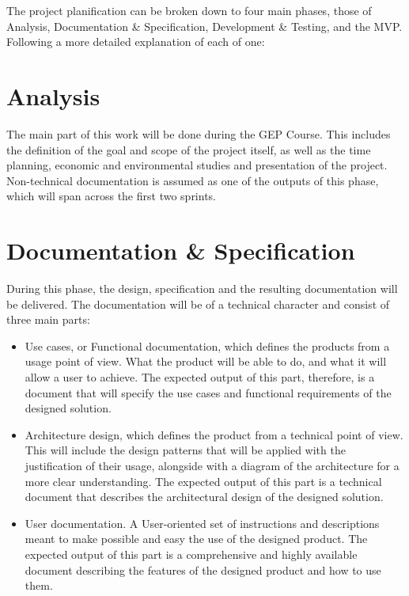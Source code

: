 The project planification can be broken down to four main phases, those of Analysis, Documentation \& Specification, Development \& Testing, and the MVP. Following a more detailed explanation of each of one:

\section{Analysis}
The main part of this work will be done during the GEP Course. This includes the definition of the goal and scope of the project itself, as well as the time planning, economic and environmental studies and presentation of the project. Non-technical documentation is assumed as one of the outputs of this phase, which will span across the first two sprints.

\section{Documentation \& Specification}
During this phase, the design, specification and the resulting documentation will be delivered. The documentation will be of a technical character and consist of three main parts:

\begin{itemize}
\item Use cases, or Functional documentation, which defines the products from a usage point of view. What the product will be able to do, and what it will allow a user to achieve. The expected output of this part, therefore, is a document that will specify the use cases and functional requirements of the designed solution.

\item Architecture design, which defines the product from a technical point of view. This will include the design patterns that will be applied with the justification of their usage, alongside with a diagram of the architecture for a more clear understanding. The expected output of this part is a technical document that describes the architectural design of the designed solution.

\item User documentation. A User-oriented set of instructions and descriptions meant to make possible and easy the use of the designed product. The expected output of this part is a comprehensive and highly available document describing the features of the designed product and how to use them.
\end{itemize}

